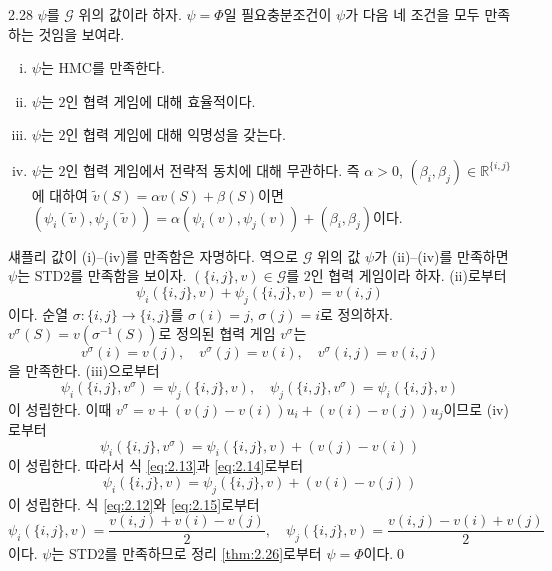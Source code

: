 \documentclass{article}
\numberwithin{equation}{section}
\begin{document}
\begin{prob}{}{2.28}
	$\psi$를 $\mathcal G$ 위의 값이라 하자. $\psi=\Phi$일 필요충분조건이 $\psi$가 다음 네 조건을 모두 만족하는 것임을 보여라.
	\begin{enumerate}[(i)]
		\item $\psi$는 HMC를 만족한다.
		\item $\psi$는 $2$인 협력 게임에 대해 효율적이다.
		\item $\psi$는 $2$인 협력 게임에 대해 익명성을 갖는다.
		\item $\psi$는 $2$인 협력 게임에서 전략적 동치에 대해 무관하다. 즉 $\alpha>0$, $(\beta_i,\beta_j)\in\mathbb R^{\{i,j\}}$에 대하여 \newline $\tilde{v}(S)=\alpha v(S)+\beta(S)$이면 $(\psi_i(\tilde{v}),\psi_j(\tilde{v}))=\alpha(\psi_i(v),\psi_j(v))+(\beta_i,\beta_j)$이다.
	\end{enumerate}
\end{prob}

\begin{sol}
	섀플리 값이 (i)--(iv)를 만족함은 자명하다. 역으로 $\mathcal G$ 위의 값 $\psi$가 (ii)--(iv)를 만족하면 $\psi$는 STD2를 만족함을 보이자. $(\{i,j\},v)\in\mathcal G$를 $2$인 협력 게임이라 하자. (ii)로부터
	\begin{equation}
		\label{eq:2.12}
		\psi_i(\{i,j\},v)+\psi_j(\{i,j\},v)=v(i,j)
	\end{equation}
	이다. 순열 $\sigma:\{i,j\}\to\{i,j\}$를 $\sigma(i)=j$, $\sigma(j)=i$로 정의하자. $v^\sigma(S)=v(\sigma^{-1}(S))$로 정의된 협력 게임 $v^\sigma$는
	\[
		v^\sigma(i)=v(j),\quad v^\sigma(j)=v(i),\quad v^\sigma(i,j)=v(i,j)
	\]
	을 만족한다. (iii)으로부터
	\begin{equation}
		\label{eq:2.13}
		\psi_i(\{i,j\},v^\sigma)=\psi_j(\{i,j\},v),\quad\psi_j(\{i,j\},v^\sigma)=\psi_i(\{i,j\},v)
	\end{equation}
	이 성립한다. 이때 $v^\sigma=v+(v(j)-v(i))u_i+(v(i)-v(j))u_j$이므로 (iv)로부터
	\begin{equation}
		\label{eq:2.14}
		\psi_i(\{i,j\},v^\sigma)=\psi_i(\{i,j\},v)+(v(j)-v(i))
	\end{equation}
	이 성립한다. 따라서 식 \ref{eq:2.13}과 \ref{eq:2.14}로부터
	\begin{equation}
		\label{eq:2.15}
		\psi_i(\{i,j\},v)=\psi_j(\{i,j\},v)+(v(i)-v(j))
	\end{equation}
	이 성립한다. 식 \ref{eq:2.12}와 \ref{eq:2.15}로부터
	\[
		\psi_i(\{i,j\},v)=\frac{v(i,j)+v(i)-v(j)}{2},\quad\psi_j(\{i,j\},v)=\frac{v(i,j)-v(i)+v(j)}{2}
	\]
	이다. $\psi$는 STD2를 만족하므로 정리 \ref{thm:2.26}로부터 $\psi=\Phi$이다.\qed
\end{sol}
\end{document}
